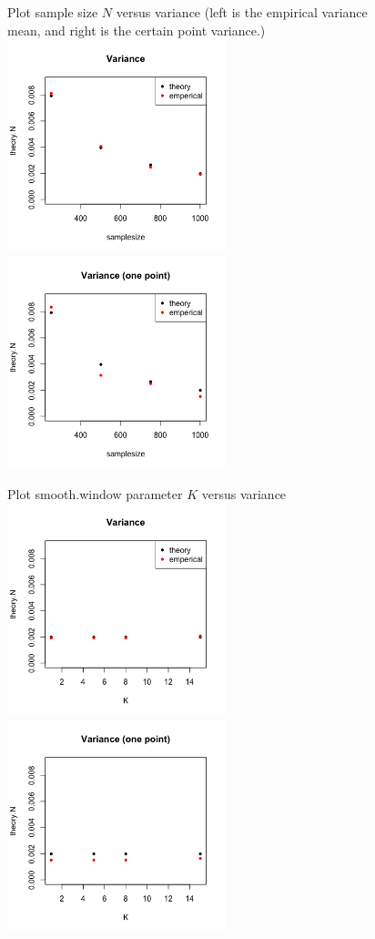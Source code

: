 \documentclass{article}
\begin{document}
\begin{itemize}
 
\begin{figure}[H]
Plot sample size $N$ versus variance (left is the empirical variance mean, and right is the certain point variance.)\\
\includegraphics[width=2.5in]{pic/variance.png}
\includegraphics[width=2.5in]{pic/variance2.png}
\end{figure}

\begin{figure}[H]
Plot smooth.window parameter $K$ versus variance\\
\includegraphics[width=2.5in]{pic/K.png}
\includegraphics[width=2.5in]{pic/K2.png}
\end{figure}


\end{itemize}
\end{document}
